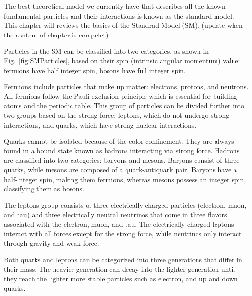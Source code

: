 
The best theoretical model we currently have that describes all the known fundamental particles and their interactions is known as the standard model.
This chapter will reviews the basics of the Standrad Model (SM). (update when the content of chapter is compelet)


Particles in the SM can be classified into two categories, as shown in Fig.~\ref{fig:SMParticles}, based on their spin (intrinsic angular momentum) value: fermions have half integer spin, bosons have full integer spin.

Fermions include particles that make up matter: electrons, protons, and neutrons. All fermions follow the Pauli exclusion principle which is essential for building atoms and the periodic table. This group of particles can be divided further into two groups based on the strong force: leptons, which do not undergo strong interactions, and quarks, which have strong nuclear interactions.

Quarks cannot be isolated because of the color confinement. They are always found in a bound state known as hadrons interacting via strong force.
Hadrons are classified into two categories: baryons and mesons.
Baryons consist of three quarks, while mesons are composed of a quark-antiquark pair.
Baryons have a half-integer spin, making them fermions, whereas mesons possess an integer spin, classifying them as bosons.

The leptons group consists of three electrically charged particles (electron, muon, and tau) and three electrically neutral neutrinos that come in three flavors associated with the electron, muon, and tau. The electrically charged leptons interact with all forces except for the strong force, while neutrinos only interact through gravity and weak force.

Both quarks and leptons can be categorized into
three generations that differ in their mass.
The heavier generation can decay into the lighter generation
until they reach the lighter more stable particles such as electron, and up and down quarks.

